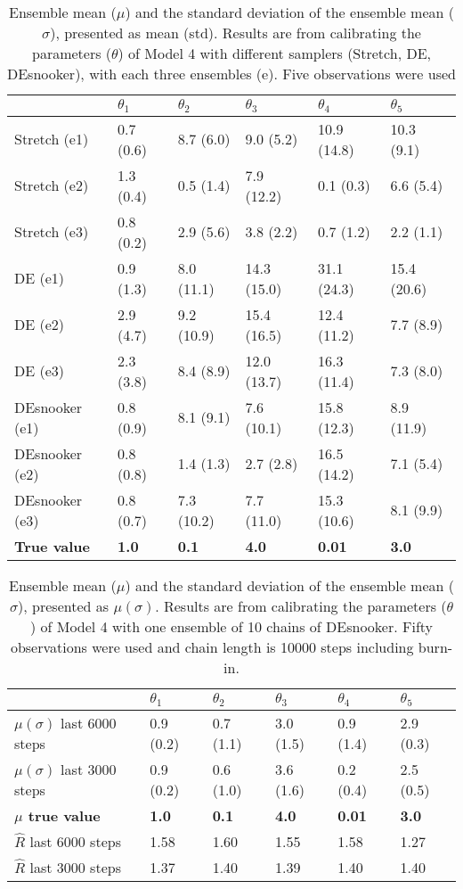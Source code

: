 \begin{table}[ht]
\caption{Ensemble mean ($\mu$) and the standard deviation of the ensemble mean ($\sigma$), presented as mean (std). Results are from calibrating the parameters ($\theta$) of Model 4 with different samplers (Stretch, DE, DEsnooker), with each three ensembles (e). Five observations were used}
\label{tab_logbook8_obs5_model4}
\begin{tabularx}{\textwidth}{lXXXXX}
\toprule
 & $\theta_1$ & $\theta_2$ & $\theta_3$ & $\theta_4$ & $\theta_5$ \\
\midrule
Stretch (e1) & 0.7 (0.6) & 8.7 (6.0) & 9.0 (5.2) & 10.9 (14.8) & 10.3 (9.1) \\
Stretch (e2) & 1.3 (0.4) & 0.5 (1.4) & 7.9 (12.2) & 0.1 (0.3) & 6.6 (5.4) \\
Stretch (e3) & 0.8 (0.2) & 2.9 (5.6) & 3.8 (2.2) & 0.7 (1.2) & 2.2 (1.1) \\
\midrule
DE (e1) & 0.9 (1.3) & 8.0 (11.1) & 14.3 (15.0) & 31.1 (24.3) & 15.4 (20.6) \\
DE (e2) & 2.9 (4.7) & 9.2 (10.9) & 15.4 (16.5) & 12.4 (11.2) & 7.7 (8.9) \\
DE (e3) & 2.3 (3.8) & 8.4 (8.9) & 12.0 (13.7) & 16.3 (11.4) & 7.3 (8.0) \\
\midrule
DEsnooker (e1) & 0.8 (0.9) & 8.1 (9.1) & 7.6 (10.1) & 15.8 (12.3) & 8.9 (11.9) \\
DEsnooker (e2) & 0.8 (0.8) & 1.4 (1.3) & 2.7 (2.8) & 16.5 (14.2) & 7.1 (5.4) \\
DEsnooker (e3) & 0.8 (0.7) & 7.3 (10.2) & 7.7 (11.0) & 15.3 (10.6) & 8.1 (9.9) \\
\midrule
\textbf{True value} & \textbf{1.0} & \textbf{0.1} &\textbf{4.0} & \textbf{0.01} &\textbf{3.0} \\
\bottomrule
\end{tabularx}
\end{table}

\begin{table}[ht]
\caption{Ensemble mean ($\mu$) and the standard deviation of the ensemble mean ($\sigma$), presented as $\mu (\sigma)$. Results are from calibrating the parameters ($\theta$) of Model 4 with one ensemble of 10 chains of DEsnooker. Fifty observations were used and chain length is 10000 steps including burn-in.}
\label{tab_logbook8_obs50_model4}
\begin{tabularx}{\textwidth}{lXXXXX}
\toprule
 & $\theta_1$ & $\theta_2$ & $\theta_3$ & $\theta_4$ & $\theta_5$ \\
\midrule
$\mu (\sigma)$ last 6000 steps & 0.9 (0.2) & 0.7 (1.1) & 3.0 (1.5) & 0.9 (1.4) & 2.9 (0.3) \\
$\mu (\sigma)$ last 3000 steps  & 0.9 (0.2) & 0.6 (1.0) & 3.6 (1.6) & 0.2 (0.4) & 2.5 (0.5) \\
\textbf{$\mu$ true value} & \textbf{1.0} & \textbf{0.1} &\textbf{4.0} & \textbf{0.01} &\textbf{3.0} \\
\midrule
$\hat{R}$ last 6000 steps & 1.58 & 1.60 & 1.55 & 1.58 & 1.27 \\
$\hat{R}$ last 3000 steps & 1.37 & 1.40 & 1.39 & 1.40 & 1.40 \\
\bottomrule
\end{tabularx}
\end{table}
